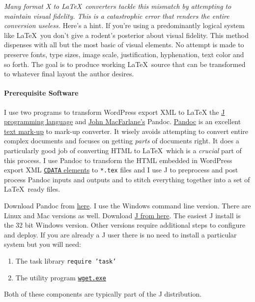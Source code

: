 \emph{Many format X to \LaTeX\ converters tackle this mismatch by
attempting to maintain visual fidelity. This is a catastrophic error
that renders the entire conversion useless.} Here's a hint. If you're
using a predominantly logical system like \LaTeX\ you don't give a
rodent's posterior about visual fidelity. This method dispenses with all
but the most basic of visual elements. No attempt is made to preserve
fonts, type sizes, image scale, justification, hyphenation, text color
and so forth. The goal is to produce working \LaTeX\ source that can be
transformed to whatever final layout the author desires.

\paragraph{Prerequisite Software}

I use two programs to transform WordPress export XML to \LaTeX\: the
\href{http://www.jsoftware.com/}{J programming language} and
\href{http://johnmacfarlane.net/}{John MacFarlane's} Pandoc.
\href{http://johnmacfarlane.net/pandoc/}{Pandoc} is an excellent
\href{http://en.wikipedia.org/wiki/Markup\_language}{text mark-up} to
mark-up converter. It wisely avoids attempting to convert entire complex
documents and focuses on getting \emph{parts} of documents right. It
does a particularly good job of converting HTML to \LaTeX\ which is a
\emph{crucial} part of this process. I use Pandoc to transform the HTML
embedded in WordPress export XML
\href{http://en.wikipedia.org/wiki/CDATA}{\texttt{CDATA} elements} to
\texttt{*.tex} files and I use J to preprocess and post process Pandoc
inputs and outputs and to stitch everything together into a set of \LaTeX\
ready files.

Download Pandoc from
\href{http://johnmacfarlane.net/pandoc/installing.html}{here}. I use the
Windows command line version. There are Linux and Mac versions as well.
Download \href{https://code.jsoftware.com/wiki/System/Installation}{J from here}. The
easiest J install is the 32 bit Windows version. Other versions
require additional steps to configure and deploy. If you are already a J
user there is no need to install a particular system but you will need:

\begin{enumerate}
\tightlist
\item
  The task library \texttt{require 'task'}
\item
  The utility program
  \href{http://www.gnu.org/software/wget/}{\texttt{wget.exe}}
\end{enumerate}
Both of these components are typically part of the J distribution.

